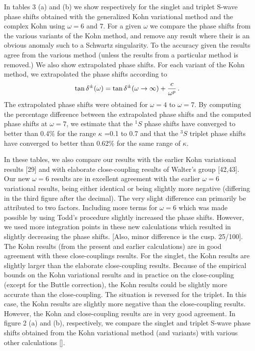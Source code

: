 \documentclass[preprint,showpacs,preprintnumbers,amsmath,amssymb]{revtex4}
\def \bea{\begin{eqnarray}}
\def\eea{\end{eqnarray}}
\begin{document}
In tables 3 (a) and (b) we show respectively for the singlet
and triplet S-wave phase shifts 
obtained with the generalized Kohn variational
method and the complex Kohn using $\omega=6$ and 7.
For a given $\omega$ we compare the phase shifts from
the various variants of the Kohn method,
and remove any result where their is an obvious
anomaly such to a Schwartz singularity.
To the accuracy given the results agree from
the various method (unless the results
from  a particular method is removed.)
We also show extrapolated phase shifts.
For each variant of the Kohn method,
we extrapolated the phase shifts according
to 
\bea
\tan\delta^\pm(\omega) = \tan\delta^\pm(\omega\to\infty) + {c\over \omega^p}\, .
\eea
The extrapolated phase shifts were obtained for
$\omega=4$ to $\omega =7$.
By computing the percentage difference between the extrapolated phase shifts
and the computed phase shifts at $\omega =7$, we estimate
that the $^1S$ phase shifts have converged to better than 0.4\%
for the range $\kappa$ =0.1 to 0.7 and that the $^3S$ triplet
phase shifts have converged to better than 0.62\%
for the same range of $\kappa$.


In these tables, we also compare our results with the earlier Kohn
variational results [29] and with  elaborate
close-coupling results of Walter's group [42,43].
Our new $\omega=6$ results are in excellent agreement with 
the earlier $\omega =6$ variational results, being either identical or 
being  slightly more negative (differing in the third figure after
the decimal). 
The very slight difference can primarily
be attributed to two factors.
Including more terms for $\omega=6$ which was made possible
by using Todd's procedure slightly increased the phase shifts.
However, we used more integration points in these new
calculations which resulted in slightly decreasing
the phase shifts.
[Also, minor difference is the cusp. 25/100].
The Kohn results (from the present and earlier calculations) 
are in good agreement with these close-couplings results.
For the singlet, the Kohn results are slightly
larger than the elaborate close-coupling results.
Because of the empirical bounds on the
Kohn variational results and in practice on
the close-coupling (except for the Buttle
correction), the Kohn results could be
slightly more accurate than the close-coupling.
The situation is reversed for the triplet.
In this case, the Kohn results are slightly
more negative than the close-coupling results.
However, the Kohn and close-coupling results are
in very good agreement.
In figure 2 (a) and (b), respectively,
we compare the singlet and triplet
S-wave phase shifts obtained from the Kohn variational
method (and variants)  with various other calculations [].
\end{document}
